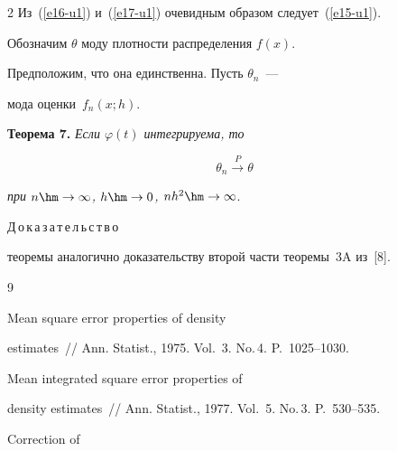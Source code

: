 \begin{multicols}{2}
Из~(\ref{e16-u1}) и~(\ref{e17-u1}) очевидным образом следует~(\ref{e15-u1}).



\smallskip



Обозначим $\theta$ моду плотности распределения $f(x)$.

Предположим, что она единственна. Пусть $\theta_n$~---

мода оценки~$f_n(x;h)$.



\medskip



\noindent

\textbf{Теорема 7.} \textit{Если $\varphi(t)$ интегрируема, то}

$$

\theta_n\xrightarrow{P}\theta

$$

\textit{при $n\hm\to\infty$, $h\hm\to0$, $nh^2\hm\to\infty$}.





\medskip



\noindent

Д\,о\,к\,а\,з\,а\,т\,е\,л\,ь\,с\,т\,в\,о\ 

теоремы аналогично доказательству второй части теоремы~3A из~[8].





{\small\frenchspacing

{%


\begin{thebibliography}{9}




 Mean square error properties of density

estimates~// Ann. Statist., 1975. Vol.~3. No.\,4. P.~1025--1030.




 Mean integrated square error properties of

density estimates~// Ann. Statist., 1977. Vol.~5. No.\,3. P.~530--535.




 Correction of


\end{thebibliography}}}
\end{multicols}

